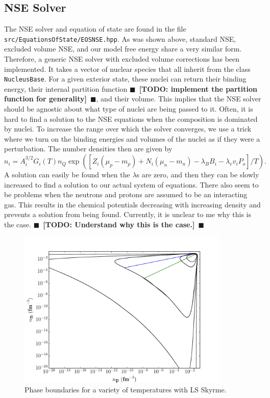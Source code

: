 \documentclass[11pt,letter]{article}
\newcommand{\todo}[1]{{$\blacksquare$~\textbf{\color{blue}[TODO: #1]}}~$\blacksquare$}
\begin{document}
\subsection{NSE Solver}
The NSE solver and equation of state are found in the file \texttt{src/EquationsOfState/EOSNSE.hpp}.  As was shown above, standard NSE, excluded volume NSE, and our model free energy share a very similar form.  Therefore, a generic NSE solver with excluded volume corrections has been implemented.  It takes a vector of nuclear species that all inherit from the class \texttt{NucleusBase}.  For a given exterior state, these nuclei can return their binding energy, their internal partition function \todo{implement the partition function for generality}, and their volume.  This implies that the NSE solver should be agnostic about what type of nuclei are being passed to it.  Often, it is hard to find a solution to the NSE equations when the composition is dominated by nuclei.  To increase the range over which the solver converges, we use a trick where we turn on the binding energies and volumes of the nuclei as if they were a perturbation.  The number densities then are given by 
\begin{equation}
n_{i} = A_i^{3/2} G_i(T) n_Q \exp\left(\left[Z_i (\mu_p - m_p) + N_i (\mu_n - m_n) 
- \lambda_B B_i - \lambda_v v_i P_o \right]/T\right).
\end{equation}
A solution can easily be found when the $\lambda$s are zero, and then they can be slowly increased to find a solution to our actual system of equations.   There also seem to be problems when the neutrons and protons are assumed to be an interacting gas.  This results in the chemical potentials decreasing with increasing density and prevents a solution from being found.  Currently, it is unclear to me why this is the case. \todo{Understand why this is the case.}

\begin{figure}[t]
\centering
\includegraphics[width=0.9\textwidth]{PhaseBoundaryDensity.pdf}
\vspace*{-0.35cm}
\caption{ Phase boundaries for a variety of temperatures with LS Skyrme.}
\vspace*{-0.7cm}
\end{figure}
\end{document}
